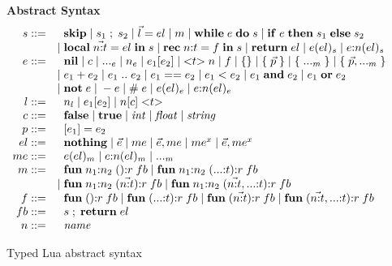 \begin{figure}[!ht]
\textbf{Abstract Syntax}\\
\dstart
$$
\begin{array}{rl}
s ::= & \;\; \mathbf{skip} \; | \;
s_{1} \; ; \; s_{2} \; | \;
\vec{l} = el \; | \;
m \; | \;
\mathbf{while} \; e \; \mathbf{do} \; s \; | \;
\mathbf{if} \; e \; \mathbf{then} \; s_{1} \; \mathbf{else} \; s_{2}\\
& | \; \mathbf{local} \; \vec{n{:}t} = el \; \mathbf{in} \; s \; | \;
\mathbf{rec} \; n{:}t = f \; \mathbf{in} \; s \; | \;
\mathbf{return} \; el \; | \;
e(el)_{s} \; | \;
e{:}n(el)_{s}\\
e ::= & \;\; \mathbf{nil} \; | \;
c \; | \;
{...}_{e} \; | \;
n_{e} \; | \;
e_{1}[e_{2}] \; | \;
{<}t{>} \; n \; | \;
f \; | \;
\{ \} \; | \;
\{ \; \vec{p} \; \} \; | \;
\{ \; {...}_{m} \; \} \; | \;
\{ \; \vec{p},{...}_{m} \; \}\\
& | \; e_{1} + e_{2} \; | \;
e_{1} \; {..} \; e_{2} \; | \;
e_{1} == e_{2} \; | \;
e_{1} < e_{2} \; | \;
e_{1} \; \mathbf{and} \; e_{2} \; | \;
e_{1} \; \mathbf{or} \; e_{2} \\
& | \; \mathbf{not} \; e \; | \;
- e \; | \;
\# \; e \; | \;
e(el)_{e} \; | \;
e{:}n(el)_{e}\\
l ::= & \;\; n_{l} \; | \;
e_{1}[e_{2}] \; | \;
n[c] \; {<}t{>}\\
c ::= & \;\; \mathbf{false} \; | \;
\mathbf{true} \; | \;
{\it int} \; | \;
{\it float} \; | \;
{\it string}\\
p ::= & \;\; [e_{1}] = e_{2}\\
el ::= & \;\; \mathbf{nothing} \; | \;
\vec{e} \; | \;
me \; | \;
\vec{e}, me \; | \;
me^{x} \; | \;
\vec{e}, me^{x}\\
me ::= & \;\; e(el)_{m} \; | \;
e{:}n(el)_{m} \; | \;
{...}_{m}\\
m ::= & \;\; \mathbf{fun} \; n_{1}{:}n_{2} \; (){:}r \; fb \; | \;
\mathbf{fun} \; n_{1}{:}n_{2} \; ({...}{:}t){:}r \; fb\\
& | \; \mathbf{fun} \; n_{1}{:}n_{2} \; (\vec{n{:}t}){:}r \; fb \; | \;
\mathbf{fun} \; n_{1}{:}n_{2} \; (\vec{n{:}t},{...}{:}t){:}r \; fb\\
f ::= & \;\; \mathbf{fun} \; (){:}r \; fb \; | \;
\mathbf{fun} \; ({...}{:}t){:}r \; fb \; | \;
\mathbf{fun} \; (\vec{n{:}t}){:}r \; fb \; | \;
\mathbf{fun} \; (\vec{n{:}t},{...}{:}t){:}r \; fb\\
fb ::= & \;\; s \;;\; \mathbf{return} \; el\\
n ::= & \;\; {\it name}\\
\end{array}
$$
\dend
\caption{Typed Lua abstract syntax}
\label{fig:syntax}
\end{figure}

